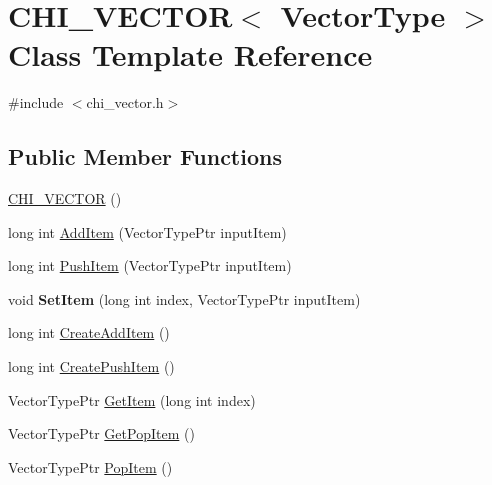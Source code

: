 \hypertarget{class_c_h_i___v_e_c_t_o_r}{}\section{C\+H\+I\+\_\+\+V\+E\+C\+T\+OR$<$ Vector\+Type $>$ Class Template Reference}
\label{class_c_h_i___v_e_c_t_o_r}


{\ttfamily \#include $<$chi\+\_\+vector.\+h$>$}

\subsection*{Public Member Functions}
\begin{DoxyCompactItemize}
\item 
\hyperlink{class_c_h_i___v_e_c_t_o_r_a2789baba8522fffd305476bab1b5e359_a2789baba8522fffd305476bab1b5e359}{C\+H\+I\+\_\+\+V\+E\+C\+T\+OR} ()
\item 
long int \hyperlink{class_c_h_i___v_e_c_t_o_r_a600ac6f3c5a721bd0d337f023624964c_a600ac6f3c5a721bd0d337f023624964c}{Add\+Item} (Vector\+Type\+Ptr input\+Item)
\item 
long int \hyperlink{class_c_h_i___v_e_c_t_o_r_a9a3e5ce973c6bf31abdb55b6dc4cda0e_a9a3e5ce973c6bf31abdb55b6dc4cda0e}{Push\+Item} (Vector\+Type\+Ptr input\+Item)
\item 
\mbox{\label{class_c_h_i___v_e_c_t_o_r_a838142e95db7a19aca572ba5fafa7d65}} 
void {\bfseries Set\+Item} (long int index, Vector\+Type\+Ptr input\+Item)
\item 
long int \hyperlink{class_c_h_i___v_e_c_t_o_r_a638665dbc1ed89dae665c77c9fe6af18_a638665dbc1ed89dae665c77c9fe6af18}{Create\+Add\+Item} ()
\item 
long int \hyperlink{class_c_h_i___v_e_c_t_o_r_ada33203459caf93e3015d0c22c92a232_ada33203459caf93e3015d0c22c92a232}{Create\+Push\+Item} ()
\item 
Vector\+Type\+Ptr \hyperlink{class_c_h_i___v_e_c_t_o_r_ae6e5604e0fece87ee38645eba659bd46_ae6e5604e0fece87ee38645eba659bd46}{Get\+Item} (long int index)
\item 
Vector\+Type\+Ptr \hyperlink{class_c_h_i___v_e_c_t_o_r_a01ae3966671bdacf558ef5ddd5ea8b6e_a01ae3966671bdacf558ef5ddd5ea8b6e}{Get\+Pop\+Item} ()
\item 
Vector\+Type\+Ptr \hyperlink{class_c_h_i___v_e_c_t_o_r_ace37af4211b79d28e7921b3aecfcf5b1_ace37af4211b79d28e7921b3aecfcf5b1}{Pop\+Item} ()

\end{DoxyCompactItemize}
